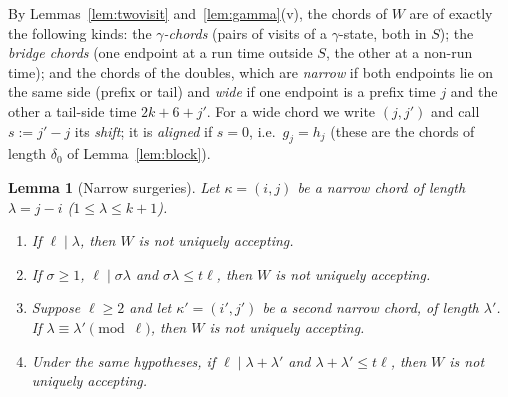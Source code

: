 \documentclass[11pt]{article}
\newtheorem{lemma}[theorem]{Lemma}
\theoremstyle{definition}
\begin{document}
By Lemmas~\ref{lem:twovisit} and~\ref{lem:gamma}(v), the chords of $W$ are
of exactly the following kinds: the \emph{$\gamma$-chords} (pairs of visits of
a $\gamma$-state, both in $S$); the \emph{bridge chords} (one endpoint at a run
time outside $S$, the other at a non-run time); and the chords of the doubles,
which are \emph{narrow} if both endpoints lie on the same side (prefix or
tail) and \emph{wide} if one endpoint is a prefix time $j$ and the other a
tail-side time $2k+6+j'$. For a wide chord we write $(j,j')$ and call
$s:=j'-j$ its \emph{shift}; it is \emph{aligned} if $s=0$, i.e.\ $g_j=h_j$
(these are the chords of length $\delta_0$ of Lemma~\ref{lem:block}).

\begin{lemma}[Narrow surgeries]\label{lem:narrow}
Let $\kappa=(i,j)$ be a narrow chord of length $\lambda=j-i$
($1\le\lambda\le k+1$).
\begin{enumerate}[leftmargin=2.2em,itemsep=2pt,label=(\alph*)]
\item If $\ell\mid\lambda$, then $W$ is not uniquely accepting.
\item If $\sigma\ge1$, $\ell\mid\sigma\lambda$ and $\sigma\lambda\le t\ell$,
then $W$ is not uniquely accepting.
\item Suppose $\ell\ge2$ and let $\kappa'=(i',j')$ be a second narrow chord,
of length $\lambda'$. If $\lambda\equiv\lambda'\pmod\ell$, then $W$ is not
uniquely accepting.
\item Under the same hypotheses, if $\ell\mid\lambda+\lambda'$ and
$\lambda+\lambda'\le t\ell$, then $W$ is not uniquely accepting.
\end{enumerate}
\end{lemma}
\end{document}

